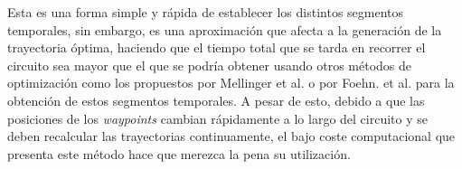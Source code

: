 Esta es una forma simple y rápida de establecer los distintos segmentos temporales, sin embargo, es una aproximación que afecta a la generación de la trayectoria óptima, haciendo que el tiempo total que se tarda en recorrer el circuito sea mayor que el que se podría obtener usando otros métodos de optimización como los propuestos por Mellinger et al. \cite{MinimunSnap2011} o por Foehn. et al. \cite{foehn2020cpc}  para la obtención de estos segmentos temporales. A pesar de esto, debido a que las posiciones de los \textit{waypoints} cambian rápidamente a lo largo del circuito y se deben recalcular las trayectorias continuamente, el bajo coste computacional que presenta este método hace que merezca la pena su utilización.


